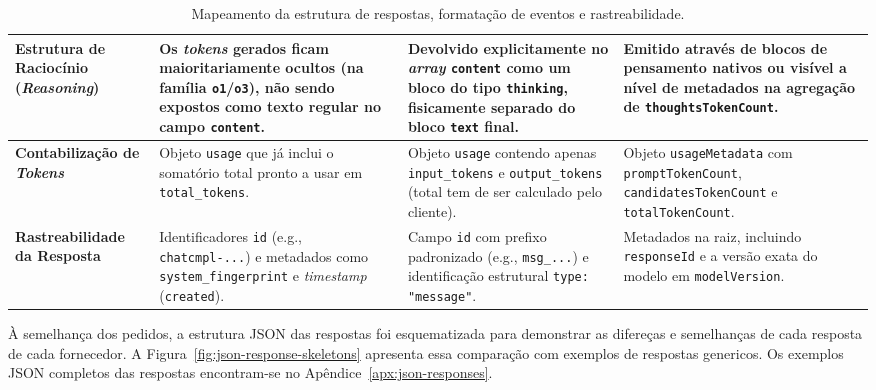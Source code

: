 \begin{table}[H]
\begin{tabularx}{\textwidth}{|>{\raggedright\arraybackslash}p{2.8cm}|Y|Y|Y|}
        \hline
        \textbf{Estrutura de Raciocínio (\textit{Reasoning})} & Os \textit{tokens} gerados ficam maioritariamente ocultos (na família \texttt{o1}/\texttt{o3}), não sendo expostos como texto regular no campo \texttt{content}. & Devolvido explicitamente no \textit{array} \texttt{content} como um bloco do tipo \texttt{thinking}, fisicamente separado do bloco \texttt{text} final. & Emitido através de blocos de pensamento nativos ou visível a nível de metadados na agregação de \texttt{thoughtsTokenCount}. \\
        \hline
        \textbf{Contabilização de \textit{Tokens}} & Objeto \texttt{usage} que já inclui o somatório total pronto a usar em \texttt{total\_tokens}. & Objeto \texttt{usage} contendo apenas \texttt{input\_tokens} e \texttt{output\_tokens} (total tem de ser calculado pelo cliente). & Objeto \texttt{usageMetadata} com \texttt{promptTokenCount}, \texttt{candidatesTokenCount} e \texttt{totalTokenCount}. \\
        \hline
        \textbf{Rastreabilidade da Resposta} & Identificadores \texttt{id} (e.g., \texttt{chatcmpl-...}) e metadados como \texttt{system\_fingerprint} e \textit{timestamp} (\texttt{created}). & Campo \texttt{id} com prefixo padronizado (e.g., \texttt{msg\_...}) e identificação estrutural \texttt{type: "message"}. & Metadados na raiz, incluindo \texttt{responseId} e a versão exata do modelo em \texttt{modelVersion}. \\
        \hline
    \end{tabularx}
    \caption{Mapeamento da estrutura de respostas, formatação de eventos e rastreabilidade.}
    \label{tab:api-response-comparison}
\end{table}

    À semelhança dos pedidos, a estrutura JSON das respostas foi esquematizada para demonstrar as difereças e semelhanças de cada resposta de cada fornecedor. A Figura~\ref{fig:json-response-skeletons} apresenta essa comparação com exemplos de respostas genericos. Os exemplos JSON completos das respostas encontram-se no Apêndice~\ref{apx:json-responses}.

